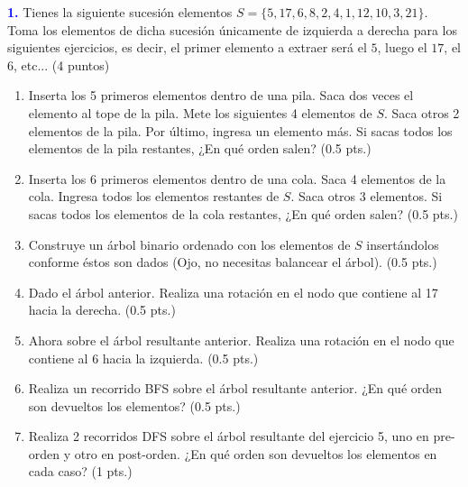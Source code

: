 \textbf{\textcolor{blue}{1.}} Tienes la siguiente sucesión elementos $S = \{5,17,6,8,2,4,1,12,10,3,21\}$. Toma los elementos de dicha sucesión únicamente de izquierda a derecha para los siguientes ejercicios, es decir, el primer elemento a extraer será el $5$, luego el $17$, el $6$, etc... (4 puntos)

\begin{enumerate}

    \item Inserta los 5 primeros elementos dentro de una pila. Saca dos veces el elemento al tope de la pila. Mete los siguientes 4 elementos de $S$. Saca otros 2 elementos de la pila. Por último, ingresa un elemento más. Si sacas todos los elementos de la pila restantes, ¿En qué orden salen? (0.5 pts.)

    \item Inserta los 6 primeros elementos dentro de una cola. Saca 4 elementos de la cola. Ingresa todos los elementos restantes de $S$. Saca otros 3 elementos. Si sacas todos los elementos de la cola restantes, ¿En qué orden salen? (0.5 pts.)
    
    \item Construye un árbol binario ordenado con los elementos de $S$ insertándolos conforme éstos son dados (Ojo, no necesitas balancear el árbol). (0.5 pts.)

    \item Dado el árbol anterior. Realiza una rotación en el nodo que contiene al 17 hacia la derecha. (0.5 pts.)

    \item Ahora sobre el árbol resultante anterior. Realiza una rotación en el nodo que contiene al 6 hacia la izquierda. (0.5 pts.)

    \item Realiza un recorrido BFS sobre el árbol resultante anterior. ¿En qué orden son devueltos los elementos? (0.5 pts.)

    \item Realiza 2 recorridos DFS sobre el árbol resultante del ejercicio 5, uno en pre-orden y otro en post-orden. ¿En qué orden son devueltos los elementos en cada caso? (1 pts.)

\end{enumerate}

